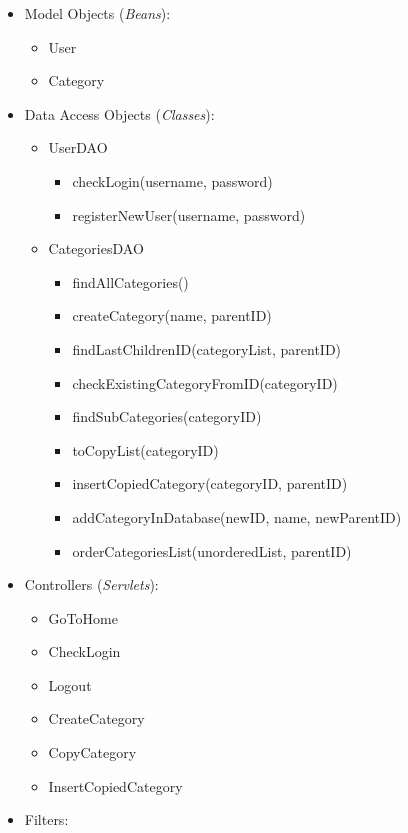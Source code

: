 \begin{itemize}
\tightlist
\item
  Model Objects (\emph{Beans}):

  \begin{itemize}
  \tightlist
  \item
    User
  \item
    Category
  \end{itemize}
\item
  Data Access Objects (\emph{Classes}):

  \begin{itemize}
  \tightlist
  \item
    UserDAO

    \begin{itemize}
    \tightlist
    \item
      checkLogin(username, password)
    \item
      registerNewUser(username, password)
    \end{itemize}
  \item
    CategoriesDAO

    \begin{itemize}
    \tightlist
    \item
      findAllCategories()
    \item
      createCategory(name, parentID)
    \item
      findLastChildrenID(categoryList, parentID)
    \item
      checkExistingCategoryFromID(categoryID)
    \item
      findSubCategories(categoryID)
    \item
      toCopyList(categoryID)
    \item
      insertCopiedCategory(categoryID, parentID)
    \item
      addCategoryInDatabase(newID, name, newParentID)
    \item
      orderCategoriesList(unorderedList, parentID)
    \end{itemize}
  \end{itemize}
\item
  Controllers (\emph{Servlets}):

  \begin{itemize}
  \tightlist
  \item
    GoToHome
  \item
    CheckLogin
  \item
    Logout
  \item
    CreateCategory
  \item
    CopyCategory
  \item
    InsertCopiedCategory
  \end{itemize}
\item
  Filters:


\end{itemize}
